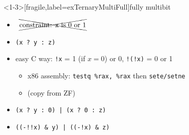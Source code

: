 \begin{frame}<1-3>[fragile,label=exTernaryMultiFull]{fully multibit}
    \begin{itemize}
        \item ~$\xcancel{\text{constraint: {\tt x} is 0 or 1}}$
        \item \lstinline|(x ? y : z)|
        \item<2-> easy C way: {\tt !x} = 1 (if $x=0$) or 0, {\tt !(!x)} = 0 or 1
            \begin{itemize}
            \item x86 assembly: {\tt testq \%rax, \%rax} then {\tt sete/setne}
            \item (copy from ZF)
            \end{itemize}
        \item<3-> {\color{green!70!black}\lstinline+(x ? y : 0)+}\lstinline+ | +{\color{blue!70!black}\lstinline+(x ? 0 : z)+}
        \item<3-> {\color{green!70!black}\lstinline+((-!!x) & y)+}\lstinline+ | +{\color{blue!70!black}\lstinline+((-!x) & z)+}
    \end{itemize}
\end{frame}

